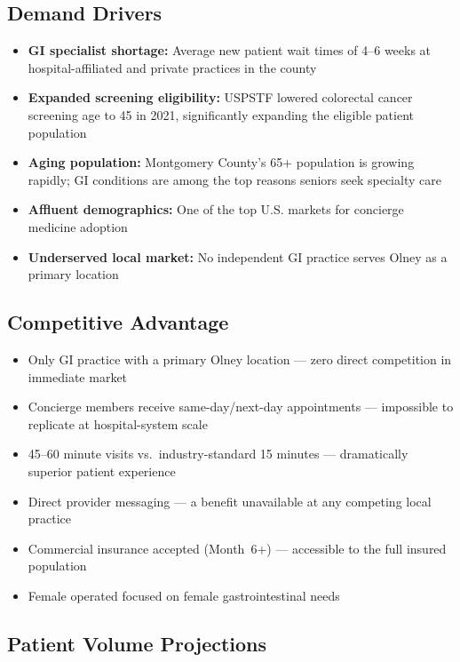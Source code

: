 \documentclass[11pt,letterpaper]{article}
\begin{document}
\subsection{Demand Drivers}

\begin{itemize}
  \item \textbf{GI specialist shortage:} Average new patient wait times of 4--6 weeks at hospital-affiliated and private practices in the county
  \item \textbf{Expanded screening eligibility:} USPSTF lowered colorectal cancer screening age to 45 in 2021, significantly expanding the eligible patient population
  \item \textbf{Aging population:} Montgomery County's 65+ population is growing rapidly; GI conditions are among the top reasons seniors seek specialty care
  \item \textbf{Affluent demographics:} One of the top U.S. markets for concierge medicine adoption
  \item \textbf{Underserved local market:} No independent GI practice serves Olney as a primary location
\end{itemize}

\subsection{Competitive Advantage}

\begin{itemize}
  \item Only GI practice with a primary Olney location --- zero direct competition in immediate market
  \item Concierge members receive same-day/next-day appointments --- impossible to replicate at hospital-system scale
  \item 45--60 minute visits vs.\ industry-standard 15 minutes --- dramatically superior patient experience
  \item Direct provider messaging --- a benefit unavailable at any competing local practice
  \item Commercial insurance accepted (Month~6+) --- accessible to the full insured population
  \item Female operated focused on female gastrointestinal needs
\end{itemize}

\subsection{Patient Volume Projections}
\end{document}
